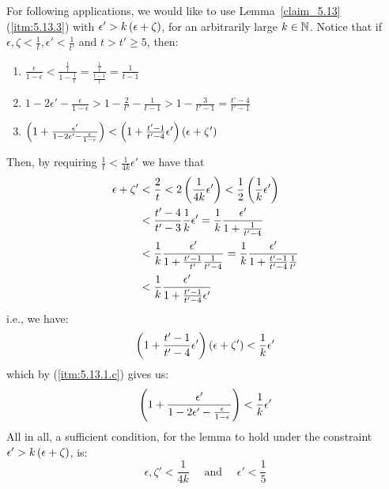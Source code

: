     \begin{remark}[Remark 5.13.1]\label{remark_5.13.1}
        For following applications, we would like to use Lemma~\ref{claim_5.13} (\ref{itm:5.13.3}) with
        $\epsilon' > k \left( \epsilon + \zeta \right)$, for an arbitrarily large $k \in \mathbb{N}$.
        Notice that if $\epsilon, \zeta < \frac{1}{t}, \epsilon' < \frac{1}{t'}$ and $t > t' \geq 5$, then:
        \begin{enumerate}[label=(\alph*), ref=\alph*]
            \item $\frac{\epsilon}{1-\epsilon} < \frac{\frac{1}{t}}{1-\frac{1}{t}} = \frac{\frac{1}{t}}{\frac{t-1}{t}}
                = \frac{1}{t-1}$
            \item $1 - 2 \epsilon' - \frac{\epsilon}{1-\epsilon} > 1 - \frac{2}{t'} - \frac{1}{t-1} > 1 - \frac{3}{t'-1}
                = \frac{t'-4}{t'-1}$
            \item\label{itm:5.13.1.c} $\left( 1 + \frac{\epsilon'}{1 - 2 \epsilon' - \frac{\epsilon}{1-\epsilon}} \right) <
                \left( 1 + \frac{t'-1}{t'-4} \epsilon' \right) \left( \epsilon + \zeta' \right)$
        \end{enumerate}
        Then, by requiring $\frac{1}{t} < \frac{1}{4k}\epsilon'$ we have that
        \begin{align*}
            \epsilon + \zeta'
                & < \frac{2}{t} < 2 \left( \frac{1}{4k}\epsilon' \right) < \frac{1}{2} \left( \frac{1}{k}\epsilon' \right) \\
                & < \frac{t'-4}{t'- 3} \frac{1}{k} \epsilon' = \frac{1}{k} \frac{\epsilon'}{1 + \frac{1}{t'-4}} \\
                & < \frac{1}{k} \frac{\epsilon'}{1 + \frac{t'-1}{t'}\frac{1}{t'-4}} = \frac{1}{k} \frac{\epsilon'}{1 + \frac{t'-1}{t'-4}\frac{1}{t'}} \\
                & < \frac{1}{k} \frac{\epsilon'}{1 + \frac{t'-1}{t'-4}\epsilon'}
        \end{align*}
        i.e., we have:
        $$
            \left( 1 + \frac{t'-1}{t'-4} \epsilon' \right) \left( \epsilon + \zeta' \right) < \frac{1}{k} \epsilon'
        $$
        which by (\ref{itm:5.13.1.c}) gives us:
        $$
            \left( 1 + \frac{\epsilon'}{1 - 2 \epsilon' - \frac{\epsilon}{1-\epsilon}} \right) < \frac{1}{k} \epsilon'
        $$
        All in all, a sufficient condition, for the lemma to hold under the constraint $\epsilon' > k \left( \epsilon + \zeta \right)$, is:
        $$
            \epsilon, \zeta' < \frac{1}{4k} \quad \text{ and } \quad \epsilon' < \frac{1}{5}
        $$
    \end{remark}

